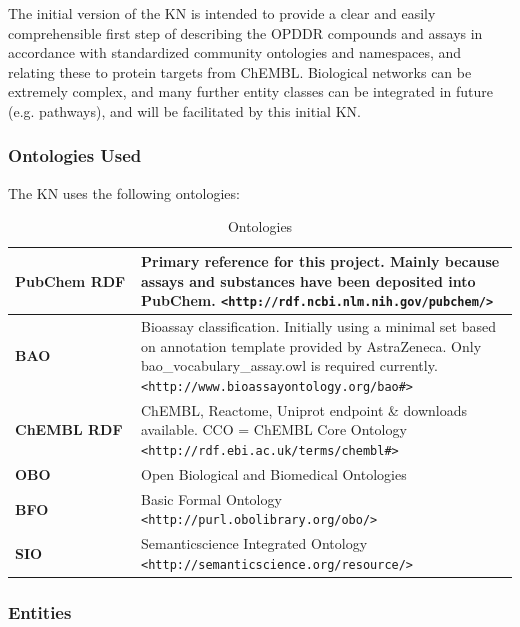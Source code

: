 The initial version of the KN is intended to provide a clear and easily comprehensible first step of describing the OPDDR compounds and assays in accordance with standardized community ontologies and namespaces, and relating these to protein targets from ChEMBL.  Biological networks can be extremely complex, and many further entity classes can be integrated in future (e.g. pathways), and will be facilitated by this initial KN.

\subsubsection{Ontologies Used}

The KN uses the following ontologies:

\begin{table}
\caption{Ontologies}
\label{tab:opddr_01}
\centering
\begin{tabular}{p{0.25\linewidth}p{0.75\linewidth}}
\hline
\textbf{PubChem RDF} & Primary reference for this project.  Mainly because assays and substances have been deposited into PubChem. 
\texttt{\textless http://rdf.ncbi.nlm.nih.gov/pubchem/\textgreater} \\
\hline
\textbf{BAO} & Bioassay classification.  Initially using a minimal set based on annotation template provided by AstraZeneca.  Only bao\_vocabulary\_assay.owl is required currently.
\texttt{\textless http://www.bioassayontology.org/bao\#\textgreater} \\
\hline
\textbf{ChEMBL RDF} & ChEMBL, Reactome, Uniprot endpoint \& downloads available.
CCO = ChEMBL Core Ontology
\texttt{\textless http://rdf.ebi.ac.uk/terms/chembl\#\textgreater} \\
\hline
\textbf{OBO} & Open Biological and Biomedical Ontologies \\
\hline
\textbf{BFO} &  Basic Formal Ontology \texttt{\textless http://purl.obolibrary.org/obo/\textgreater} \\
\hline
\textbf{SIO} & Semanticscience Integrated Ontology
\texttt{\textless http://semanticscience.org/resource/\textgreater} \\
\hline
\end{tabular}
\end{table}


\subsubsection{Entities}

